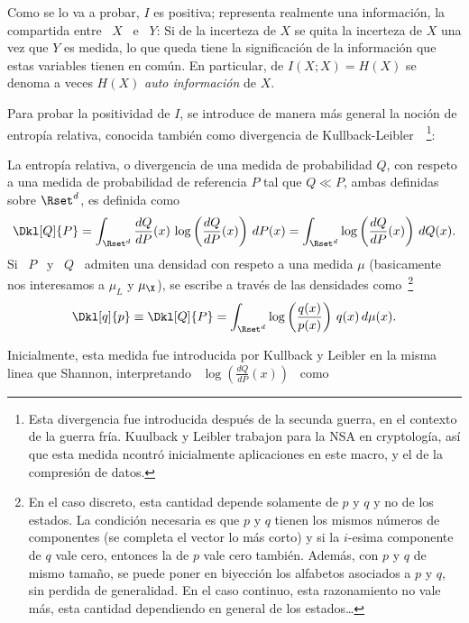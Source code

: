 Como se lo va a probar, $I$ es positiva; representa realmente una informaci\'on,
la compartida  entre \ $X$  \ e  \ $Y$: Si  de la incerteza  de $X$ se  quita la
incerteza  de  $X$   una  vez  que  $Y$  es  medida,  lo   que  queda  tiene  la
significaci\'on de  la informaci\'on que  estas variables tienen en  com\'un. En
particular, de $I(X;X) = H(X)$ se denoma a veces $H(X)$ {\it auto informaci\'on}
de $X$.

Para  probar la  positividad de  $I$, se  introduce de  manera m\'as  general la
noci\'on  de  entrop\'ia  relativa,   conocida  tambi\'en  como  divergencia  de
Kullback-Leibler~\cite{KulLei51,    Kul68,    CovTho06,    Rio07}~\footnote{Esta
  divergencia fue introducida despu\'es de  la secunda guerra, en el contexto de
  la guerra  fr\'ia. Kuulback y Leibler  trabajon para la  NSA en cryptolog\'ia,
  as\'i que esta medida ncontr\'o  inicialmente aplicaciones en este macro, y el
  de la compresi\'on de datos.}:
%
\begin{definicion}
\label{Def:SZ:entropiarelativa}
%
La entrop\'ia  relativa, o  divergencia de una  medida de probabilidad  $Q$, con
respeto a una medida de probabilidad de referencia $P$ tal que \underline{$Q \ll
  P$}, ambas definidas sobre $\Rset^d$, es definida como
  \[
  \Dkl[Q]{P}  =  \int_{\Rset^d}  \frac{dQ}{dP}(x) \, \log  \left(  \frac{dQ}{dP}(x)
  \right)  \, dP(x)  = \int_{\Rset^d}  \log \left(  \frac{dQ}{dP}(x)  \right) \,
  dQ(x).
  \]
  Si \  $P$ \  y \ $Q$  \ admiten una  densidad con  respeto a una  medida $\mu$
  (basicamente nos interesamos  a $\mu_L$ y $\mu_\X$), se  escribe a trav\'es de
  las  densidades  como~\footnote{En el  caso  discreto,  esta cantidad  depende
    solamente de $p$ y $q$ y no  de los estados. La condici\'on necesaria es que
    $p$ y $q$ tienen los mismos  n\'umeros de componentes (se completa el vector
    lo m\'as corto)  y si la $i$-esima componente de $q$  vale cero, entonces la
    de $p$ vale  cero tambi\'en.  Adem\'as, con $p$ y $q$  de mismo tama\~no, se
    puede poner en biyecci\'on los alfabetos  asociados a $p$ y $q$, sin perdida
    de generalidad.  En el caso  continuo, esta razonamiento no vale m\'as, esta
    cantidad dependiendo en general de los estados\ldots}
 \[
 \Dkl[q]{p}  \equiv \Dkl[Q]{P}  = \int_{\Rset^d}  \log  \left( \frac{q(x)}{p(x)}
 \right) \, q(x) \, d\mu(x).
 \]
\end{definicion}
%
Inicialmente, esta  medida fue  introducida por Kullback  y Leibler en  la misma
linea  que Shannon, interpretando  \ $\log\left(\frac{dQ}{dP}(x)\right)$  \ como
